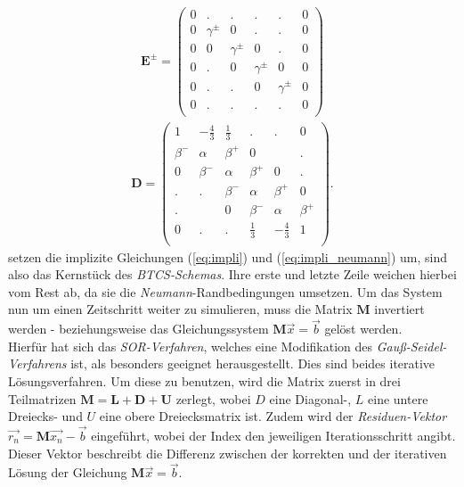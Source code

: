 \documentclass[12pt,a4paper,titlepage,headinclude,bibtotoc]{scrartcl}
\begin{document}
\begin{align*}
\boldsymbol{E^\pm} = \begin{pmatrix}
	0 & . & .& .& .& 0\\
	0 & \gamma^\pm & 0 & . & . & 0\\
	0 & 0 & \gamma^\pm & 0 & . & 0\\
	0 & . & 0 & \gamma^\pm & 0  & 0\\  
	0 & . & . & 0 &  \gamma^\pm & 0\\ 
	0 & . & .& .& .& 0\\
 \end{pmatrix}
\end{align*}
\begin{align*}
 \boldsymbol{D} = \begin{pmatrix}
	1 & -\frac{4}{3} & \frac{1}{3} & .& .& 0\\
	\beta^- & \alpha & \beta^+ & 0 &  & .\\ 
	0 & \beta^- & \alpha & \beta^+ & 0 & .\\ 
	. & . & \beta^- & \alpha & \beta^+ & 0\\ 
	. &   & 0 & \beta^- & \alpha & \beta^+\\ 
	0 & . & .& \frac{1}{3} & -\frac{4}{3} & 1\\
 \end{pmatrix}.
 \end{align*}
 setzen die implizite Gleichungen (\ref{eq:impli}) und (\ref{eq:impli_neumann}) um, sind also das Kernstück des \textit{BTCS-Schemas}. Ihre erste und letzte Zeile weichen hierbei vom Rest ab, da sie die \textit{Neumann}-Randbedingungen umsetzen.
Um das System nun um einen Zeitschritt weiter zu simulieren, muss die Matrix $\textbf{M}$ invertiert werden - beziehungsweise das Gleichungssystem $\textbf{M} \vec{x} = \vec{b}$ gelöst werden.\\
Hierfür hat sich das \textit{SOR-Verfahren}, welches eine Modifikation des \textit{Gauß-Seidel-Verfahrens} ist, als besonders geeignet herausgestellt. Dies sind beides iterative Lösungsverfahren. Um diese zu benutzen, wird die Matrix zuerst in drei Teilmatrizen $\boldsymbol{M}=\boldsymbol{L}+\boldsymbol{D}+\boldsymbol{U}$ zerlegt, wobei $D$ eine Diagonal-, $L$ eine untere Dreiecks- und $U$ eine obere Dreiecksmatrix ist. Zudem wird der \textit{Residuen-Vektor} $\vec{r_n} = \boldsymbol{M} \vec{x_n} - \vec{b}$ eingeführt, wobei der Index den jeweiligen Iterationsschritt angibt. Dieser Vektor beschreibt die Differenz zwischen der korrekten und der iterativen Lösung der Gleichung $\boldsymbol{M} \vec{x} = \vec{b}$.\\
\end{document}
